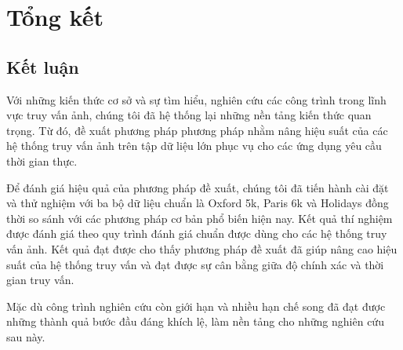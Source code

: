 \def\baselinestretch{1}
\chapter{Tổng kết}
\label{chapter:summarize}
\ifpdf
    \graphicspath{{Conclusions/ConclusionsFigs/PNG/}{Conclusions/ConclusionsFigs/PDF/}{Conclusions/ConclusionsFigs/}}
\else
    \graphicspath{{Conclusions/ConclusionsFigs/EPS/}{Conclusions/ConclusionsFigs/}}
\fi

\section{Kết luận}
Với những kiến thức cơ sở và sự tìm hiểu, nghiên cứu các công trình trong lĩnh vực truy vấn ảnh, chúng tôi đã hệ thống lại những nền tảng kiến thức quan trọng. Từ đó, đề xuất phương pháp phương pháp nhằm nâng hiệu suất của các hệ thống truy vấn ảnh trên tập dữ liệu lớn phục vụ cho các ứng dụng yêu cầu thời gian thực.

Để đánh giá hiệu quả của phương pháp đề xuất, chúng tôi đã tiến hành cài đặt và thử nghiệm với ba bộ dữ liệu chuẩn là Oxford 5k, Paris 6k và Holidays đồng thời so sánh với các phương pháp cơ bản phổ biến hiện nay. Kết quả thí nghiệm được đánh giá theo quy trình đánh giá chuẩn được dùng cho các hệ thống truy vấn ảnh. Kết quả đạt được cho thấy phương pháp đề xuất đã giúp nâng cao hiệu suất của hệ thống truy vấn và đạt được sự cân bằng giữa độ chính xác và thời gian truy vấn.

Mặc dù công trình nghiên cứu còn giới hạn và nhiều hạn chế song đã đạt được những thành quả bước đầu đáng khích lệ, làm nền tảng cho những nghiên cứu sau này.

